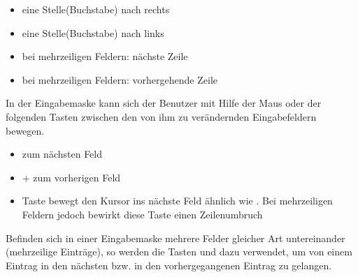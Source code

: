 \begin{itemize}
\item \Taste{$\rightarrow$} eine Stelle(Buchstabe) nach rechts
\item \Taste{$\leftarrow$} eine Stelle(Buchstabe) nach links
\item bei mehrzeiligen Feldern: \Taste{$\downarrow$} n\"{a}chste Zeile
\item bei mehrzeiligen Feldern: \Taste{$\uparrow$} vorhergehende Zeile
\end{itemize}

In der Eingabemaske kann sich der Benutzer mit Hilfe der Maus oder der
folgenden Tasten zwischen den von ihm zu ver\"{a}ndernden Eingabefeldern
bewegen.

\begin{itemize}
\item {} zum n\"{a}chsten Feld
\item {}+ zum vorherigen Feld
\item {} Taste bewegt den Kursor ins n\"{a}chste Feld \"{a}hnlich
	wie . Bei mehrzeiligen Feldern jedoch bewirkt diese
	Taste einen Zeilenumbruch
\end{itemize}

Befinden sich in einer Eingabemaske mehrere Felder gleicher Art
untereinander (mehrzeilige Eintr\"{a}ge), so werden die Tasten
 und  dazu verwendet, um
von einem Eintrag in den n\"{a}chsten bzw. in den vorhergegangenen
Eintrag zu gelangen.\\
\\


